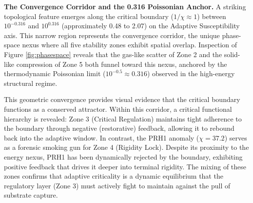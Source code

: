 \documentclass[11pt,letterpaper]{article}
\begin{document}
\textbf{The Convergence Corridor and the 0.316 Poissonian Anchor.} A striking topological feature emerges along the critical boundary ($1/\chi \approx 1$) between $10^{-0.316}$ and $10^{0.316}$ (approximately 0.48 to 2.07) on the Adaptive Susceptibility axis. This narrow region represents the convergence corridor, the unique phase-space nexus where all five stability zones exhibit spatial overlap. Inspection of Figure \ref{fig:phasespace} reveals that the gas-like scatter of Zone 2 and the solid-like compression of Zone 5 both funnel toward this nexus, anchored by the thermodynamic Poissonian limit ($10^{-0.5} \approx 0.316$) observed in the high-energy structural regime.

This geometric convergence provides visual evidence that the critical boundary functions as a conserved attractor. Within this corridor, a critical functional hierarchy is revealed: Zone 3 (Critical Regulation) maintains tight adherence to the boundary through negative (restorative) feedback, allowing it to rebound back into the adaptive window. In contrast, the PRH1 anomaly ($\chi = 37.2$) serves as a forensic smoking gun for Zone 4 (Rigidity Lock). Despite its proximity to the energy nexus, PRH1 has been dynamically rejected by the boundary, exhibiting positive feedback that drives it deeper into terminal rigidity. The mixing of these zones confirms that adaptive criticality is a dynamic equilibrium that the regulatory layer (Zone 3) must actively fight to maintain against the pull of substrate capture.
\end{document}

